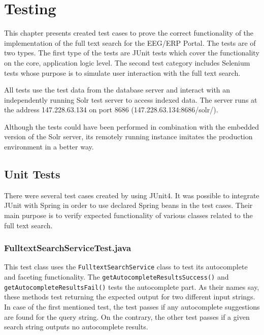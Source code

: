 \chapter{Testing}
\label{chap:testing}


This chapter presents created test cases to prove the correct functionality of the implementation of the full text search for the EEG/ERP Portal. The tests are of two types. The first type of the tests are JUnit tests which cover the functionality on the core, application logic level. The second test category includes Selenium tests whose purpose is to simulate user interaction with the full text search.

All tests use the test data from the database server and interact with an independently running Solr test server to access indexed data. The server runs at the address 147.228.63.134 on port 8686 (147.228.63.134:8686/solr/).

Although the tests could have been performed in combination with the embedded version of the Solr server, its remotely running instance imitates the production environment in a better way.



\section{Unit Tests}

There were several test cases created by using JUnit4. It was possible to integrate JUnit with Spring in order to use declared Spring beans in the test cases. 
Their main purpose is to verify expected functionality of various classes related to the full text search.

\subsection{FulltextSearchServiceTest.java}

This test class uses the \texttt{FulltextSearchService} class to test its autocomplete and faceting functionality.
The \texttt{getAutocompleteResultsSuccess()} and \texttt{getAuto\-complete\-Results\-Fail()} tests the autocomplete part.
As their names say, these methods test returning the expected output for two different input strings. 
In case of the first mentioned test, the test passes if any autocomplete suggestions are found for the query string.
On the contrary, the other test passes if a given search string outputs no autocomplete results.


